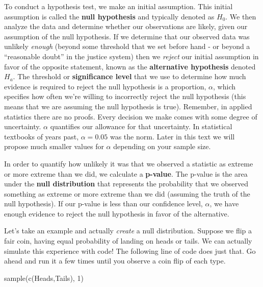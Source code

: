\documentclass[
  letterpaper,
  DIV=11,
  numbers=noendperiod]{scrreprt}
\newenvironment{Shaded}{\begin{snugshade}}{\end{snugshade}}
\newcommand{\DecValTok}[1]{\textcolor[rgb]{0.68,0.00,0.00}{#1}}
\newcommand{\FunctionTok}[1]{\textcolor[rgb]{0.28,0.35,0.67}{#1}}
\newcommand{\NormalTok}[1]{\textcolor[rgb]{0.00,0.23,0.31}{#1}}
\newcommand{\StringTok}[1]{\textcolor[rgb]{0.13,0.47,0.30}{#1}}
\begin{document}
To conduct a hypothesis test, we make an initial assumption. This
initial assumption is called the \textbf{null hypothesis} and typically
denoted as \(H_0\). We then analyze the data and determine whether our
observations are likely, given our assumption of the null hypothesis. If
we determine that our observed data was unlikely \emph{enough} (beyond
some threshold that we set before hand - or beyond a ``reasonable
doubt'' in the justice system) then we \emph{reject} our initial
assumption in favor of the opposite statement, known as the
\textbf{alternative hypothesis} denoted \(H_a\). The threshold or
\textbf{significance level} that we use to determine how much evidence
is required to reject the null hypothesis is a proportion, \(\alpha\),
which specifies how often we're willing to incorrectly reject the null
hypothesis (this means that we are assuming the null hypothesis is
true). Remember, in applied statistics there are no proofs. Every
decision we make comes with some degree of uncertainty. \(\alpha\)
quantifies our allowance for that uncertainty. In statistical textbooks
of years past, \(\alpha = 0.05\) was the norm. Later in this text we
will propose much smaller values for \(\alpha\) depending on your sample
size.

In order to quantify how unlikely it was that we observed a statistic as
extreme or more extreme than we did, we calculate a \textbf{p-value}.
The p-value is the area under the \textbf{null distribution} that
represents the probability that we observed something as extreme or more
extreme than we did (assuming the truth of the null hypothesis). If our
p-value is less than our confidence level, \(\alpha\), we have enough
evidence to reject the null hypothesis in favor of the alternative.

Let's take an example and actually \emph{create} a null distribution.
Suppose we flip a fair coin, having equal probability of landing on
heads or tails. We can actually simulate this experience with code! The
following line of code does just that. Go ahead and run it a few times
until you observe a coin flip of each type.

\begin{Shaded}
\begin{Highlighting}[]
\FunctionTok{sample}\NormalTok{(}\FunctionTok{c}\NormalTok{(}\StringTok{\textquotesingle{}Heads\textquotesingle{}}\NormalTok{,}\StringTok{\textquotesingle{}Tails\textquotesingle{}}\NormalTok{), }\DecValTok{1}\NormalTok{)}
\end{Highlighting}
\end{Shaded}
\end{document}
